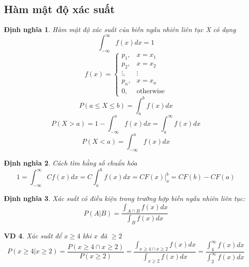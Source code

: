 \documentclass[12pt]{article}
\newtheorem{thm}{Định nghĩa}
\newtheorem{ex}[thm]{VD}
\begin{document}
\subsection{Hàm mật độ xác suất}
\begin{thm}
Hàm mật độ xác suất của biến ngẫu nhiên liên tục X có dạng
\begin {equation}
\int_{-\infty}^{\infty} f(x)dx = 1
\end{equation}
\begin {equation}
f(x) = \begin{cases}
p_1, & x = x_1 \\
p_2, & x = x_2 \\
\vdots, & \vdots \\
p_n, & x = x_n \\
0, & \text{otherwise}
\end{cases}
\end{equation}
\begin {equation}
P(a \leq X \leq b) = \int_a^b f(x)dx
\end{equation}
\begin {equation}
P(X > a) = 1 - \int_{-\infty}^a f(x)dx = \int_a^{\infty} f(x)dx
\end{equation}
\begin {equation}
P(X < a) = \int_{-\infty}^a f(x)dx
\end{equation}
\end{thm}

\begin {thm}
Cách tìm hằng số chuẩn hóa
\begin {equation}
1 = \int_{-\infty}^{\infty} Cf(x)dx = C\int_a^b f(x)dx = CF(x)|^b_a = CF(b) - CF(a)
\end{equation}
\end{thm}

\begin{thm}
    Xác suất có điều kiện trong trường hợp biến ngẫu nhiên liên tục:
    \begin{equation}
    P(A|B) = \frac{\int_{A \cap B} f(x)dx}{\int_B f(x)dx}
    \end{equation}
\end{thm}
\begin{ex}
    Xác suất để $x \geq 4$ khi $x$ đã $\geq 2$
    \begin{equation}
    P(x \geq 4 | x \geq 2) = \frac{P(x \geq 4 \cap x \geq 2)}{P(x \geq 2)} = \frac{\int_{x \geq 4 \cap x \geq 2} f(x)dx}{\int_{x \geq 2} f(x)dx} = \frac{\int_{4}^{\infty} f(x)dx}{\int_{2}^{\infty} f(x)dx}
    \end{equation}
\end{ex}
\end{document}
